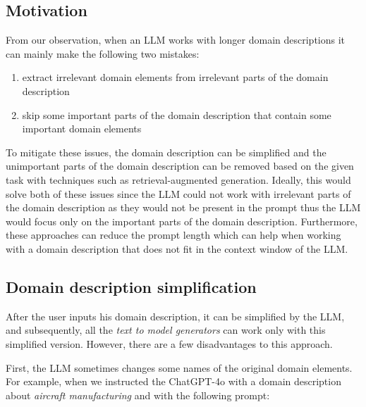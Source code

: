 \subsection{Motivation}

From our observation, when an LLM works with longer domain descriptions it can mainly make the following two mistakes:

\begin{enumerate}
\item extract irrelevant domain elements from irrelevant parts of the domain description
\item skip some important parts of the domain description that contain some important domain elements
\end{enumerate}


To mitigate these issues, the domain description can be simplified and the unimportant parts of the domain description can be removed based on the given task with techniques such as retrieval-augmented generation. Ideally, this would solve both of these issues since the LLM could not work with irrelevant parts of the domain description as they would not be present in the prompt thus the LLM would focus only on the important parts of the domain description.
Furthermore, these approaches can reduce the prompt length which can help when working with a domain description that does not fit in the context window of the LLM.



\subsection{Domain description simplification}

After the user inputs his domain description, it can be simplified by the LLM, and subsequently, all the \emph{text to model generators} can work only with this simplified version. However, there are a few disadvantages to this approach.

First, the LLM sometimes changes some names of the original domain elements. For example, when we instructed the ChatGPT-4o with a domain description about \emph{aircraft manufacturing} and with the following prompt: \\

